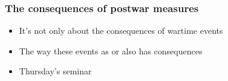 \documentclass[aspectratio=43]{beamer}
\begin{document}





\begin{frame}
\frametitle{The consequences of postwar measures}
\centering

\begin{itemize}
  \item It's not only about the consequences of wartime events
  \item The way these events as {\color{red}{remembered}} or {\color{red}{memorialized}} also has consequences
  \item Thursday's seminar
\end{itemize}

\end{frame}
\end{document}
